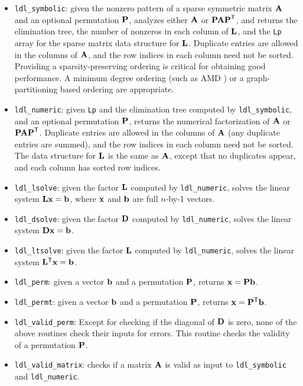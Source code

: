 \documentclass[12pt]{article}
\newcommand{\m}[1]{{\bf{#1}}}       %
\newcommand{\tr}{^{\sf T}}          %
\begin{document}
\begin{itemize}
\item {\tt ldl\_symbolic}:  given the nonzero pattern of a sparse symmetric
    matrix $\m{A}$ and an optional permutation $\m{P}$, analyzes either
    $\m{A}$ or $\m{PAP}\tr$, and returns the elimination tree, the
    number of nonzeros in each column of $\m{L}$, and the {\tt Lp} array
    for the sparse matrix data structure for $\m{L}$.
    Duplicate entries are allowed in the columns of $\m{A}$, and the
    row indices in each column need not be sorted.
    Providing a sparsity-preserving ordering is critical for obtaining
    good performance.  A minimum degree ordering
    (such as AMD \cite{AmestoyDavisDuff96,AmestoyDavisDuff03})
    or a graph-partitioning based ordering are appropriate.
\item {\tt ldl\_numeric}:  given {\tt Lp} and the elimination tree computed
    by {\tt ldl\_symbolic}, and an optional permutation $\m{P}$,
    returns the numerical factorization of $\m{A}$ or $\m{PAP}\tr$.
    Duplicate entries are allowed in the columns of $\m{A}$
    (any duplicate entries are summed), and the
    row indices in each column need not be sorted.
    The data structure for $\m{L}$ is the same as $\m{A}$, except that
    no duplicates appear, and each column has sorted row indices.
\item {\tt ldl\_lsolve}:  given the factor $\m{L}$ computed by
    {\tt ldl\_numeric}, solves the linear system $\m{Lx}=\m{b}$, where
    $\m{x}$ and $\m{b}$ are full $n$-by-1 vectors.
\item {\tt ldl\_dsolve}:  given the factor $\m{D}$ computed by
    {\tt ldl\_numeric}, solves the linear system $\m{Dx}=\m{b}$.
\item {\tt ldl\_ltsolve}:  given the factor $\m{L}$ computed by
    {\tt ldl\_numeric}, solves the linear system $\m{L}\tr\m{x}=\m{b}$.
\item {\tt ldl\_perm}: given a vector $\m{b}$ and a permutation $\m{P}$,
    returns $\m{x}=\m{Pb}$.
\item {\tt ldl\_permt}: given a vector $\m{b}$ and a permutation $\m{P}$,
    returns $\m{x}=\m{P}\tr\m{b}$.
\item {\tt ldl\_valid\_perm}:  Except for checking if the diagonal of
    $\m{D}$ is zero, none of the above routines check their inputs for errors.
    This routine checks the validity of a permutation $\m{P}$.
\item {\tt ldl\_valid\_matrix}:  checks if a matrix $\m{A}$ is valid as input
    to {\tt ldl\_symbolic} and {\tt ldl\_numeric}.
\end{itemize}
\end{document}
